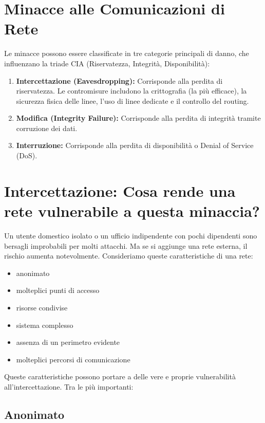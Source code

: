 \documentclass{article}
\begin{document}
\section*{Minacce alle Comunicazioni di Rete}

Le minacce possono essere classificate in tre categorie principali di danno, che influenzano la triade CIA (Riservatezza, Integrità, Disponibilità):

\begin{enumerate}
    \item \textbf{Intercettazione (Eavesdropping):} Corrisponde alla perdita di riservatezza. Le contromisure includono la crittografia (la più efficace), la sicurezza fisica delle linee, l'uso di linee dedicate e il controllo del routing.
    \item \textbf{Modifica (Integrity Failure):} Corrisponde alla perdita di integrità tramite corruzione dei dati.
    \item \textbf{Interruzione:} Corrisponde alla perdita di disponibilità o Denial of Service (DoS).
\end{enumerate}

\section*{Intercettazione: Cosa rende una rete vulnerabile a questa minaccia?}

Un utente domestico isolato o un ufficio indipendente con pochi dipendenti sono bersagli improbabili per molti attacchi. Ma se si aggiunge una rete esterna, il rischio aumenta notevolmente. Consideriamo queste caratteristiche di una rete:

\begin{itemize}
    \item anonimato
    \item molteplici punti di accesso
    \item risorse condivise
    \item sistema complesso
    \item assenza di un perimetro evidente
    \item molteplici percorsi di comunicazione
\end{itemize}

Queste caratteristiche possono portare a delle vere e proprie vulnerabilità all'intercettazione. Tra le più importanti:

\subsection*{Anonimato}
\end{document}
